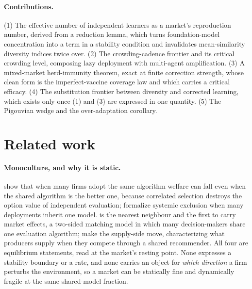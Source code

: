 \documentclass{article}
\theoremstyle{plain}
\theoremstyle{definition}
\begin{document}
\paragraph{Contributions.}
(1) The effective number of independent learners as a market's reproduction number, derived from a reduction lemma, which turns foundation-model concentration into a term in a stability condition and invalidates mean-similarity diversity indices twice over. (2) The crowding-cadence frontier and its critical crowding level, composing lazy deployment with multi-agent amplification. (3) A mixed-market herd-immunity theorem, exact at finite correction strength, whose clean form is the imperfect-vaccine coverage law and which carries a critical efficacy. (4) The substitution frontier between diversity and corrected learning, which exists only once (1) and (3) are expressed in one quantity. (5) The Pigouvian wedge and the over-adaptation corollary.

\section{Related work}

\paragraph{Monoculture, and why it is static.}
\citet{kleinberg2021} show that when many firms adopt the same algorithm welfare can fall even when the shared algorithm is the better one, because correlated selection destroys the option value of independent evaluation; \citet{bommasani2022} formalize systemic exclusion when many deployments inherit one model. \citet{peng2024} is the nearest neighbour and the first to carry market effects, a two-sided matching model in which many decision-makers share one evaluation algorithm; \citet{jagadeesan2023} make the supply-side move, characterizing what producers supply when they compete through a shared recommender. All four are equilibrium statements, read at the market's resting point. None expresses a stability boundary or a rate, and none carries an object for \emph{which direction} a firm perturbs the environment, so a market can be statically fine and dynamically fragile at the same shared-model fraction.
\end{document}
